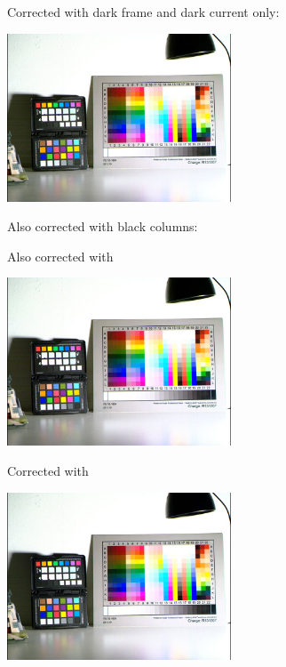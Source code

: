 Corrected with dark frame and dark current only:\\
 
\begin{center}
\includegraphics[height=5cm]{images/10ms+4-no-blackcol-small}
\end{center}

Also corrected with black columns: 

\begin{center}
\end{center}

Also corrected with  

\begin{center}
\includegraphics[height=5cm]{images/10ms+4-fixrn-small}
\end{center}

Corrected with 

\begin{center}
\includegraphics[height=5cm]{images/10ms+4-rnfilter2-small}
\end{center}


